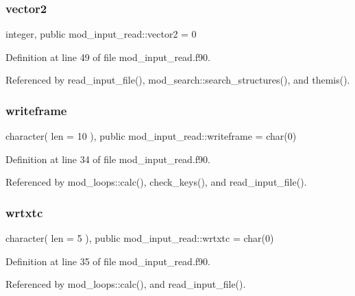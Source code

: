 \mbox{\label{namespacemod__input__read_a4f1ca96e94c5298b480fa8d43bb1b915}} 
\subsubsection{\texorpdfstring{vector2}{vector2}}
{\footnotesize\ttfamily integer, public mod\+\_\+input\+\_\+read\+::vector2 = 0}



Definition at line 49 of file mod\+\_\+input\+\_\+read.\+f90.



Referenced by read\+\_\+input\+\_\+file(), mod\+\_\+search\+::search\+\_\+structures(), and themis().

\mbox{\label{namespacemod__input__read_a02f99bb5470feaf35ab2fc228c797f64}} 
\subsubsection{\texorpdfstring{writeframe}{writeframe}}
{\footnotesize\ttfamily character( len = 10 ), public mod\+\_\+input\+\_\+read\+::writeframe = char(0)}



Definition at line 34 of file mod\+\_\+input\+\_\+read.\+f90.



Referenced by mod\+\_\+loops\+::calc(), check\+\_\+keys(), and read\+\_\+input\+\_\+file().

\mbox{\label{namespacemod__input__read_af757b04e60563ace187ed465be839553}} 
\subsubsection{\texorpdfstring{wrtxtc}{wrtxtc}}
{\footnotesize\ttfamily character( len = 5 ), public mod\+\_\+input\+\_\+read\+::wrtxtc = char(0)}



Definition at line 35 of file mod\+\_\+input\+\_\+read.\+f90.



Referenced by mod\+\_\+loops\+::calc(), and read\+\_\+input\+\_\+file().

